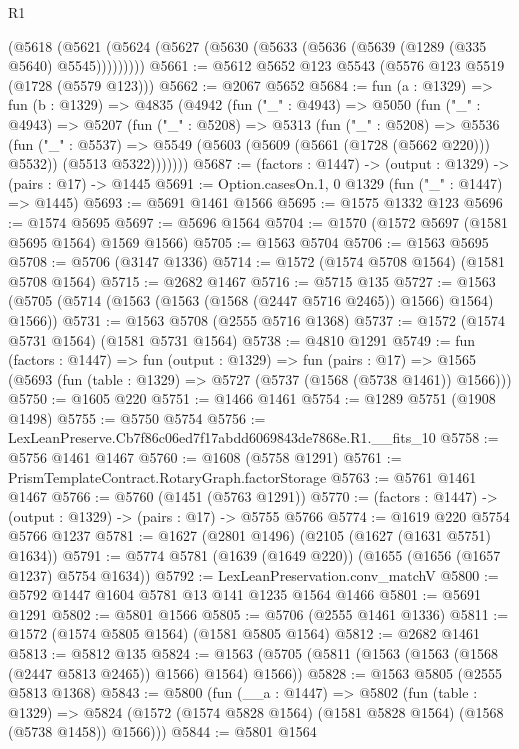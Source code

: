 \begin{lexlean}{R1}
\begin{coremodule}
    (@5618 (@5621 (@5624 (@5627 (@5630 (@5633 (@5636 (@5639 (@1289 (@335 @5640) @5545)))))))))
@5661 := @5612 @5652 @123 @5543 (@5576 @123 @5519 (@1728 (@5579 @123)))
@5662 := @2067 @5652
@5684 := fun (a : @1329) =>
  fun (b : @1329) =>
  @4835
    (@4942
      (fun ("_" : @4943) =>
      @5050
        (fun ("_" : @4943) =>
        @5207
          (fun ("_" : @5208) =>
          @5313
            (fun ("_" : @5208) =>
            @5536
              (fun ("_" : @5537) =>
              @5549 (@5603 (@5609 (@5661 (@1728 (@5662 @220))) @5532)) (@5513 @5322)))))))
@5687 := (factors : @1447) -> (output : @1329) -> (pairs : @17) -> @1445
@5691 := Option.casesOn.{1, 0} @1329 (fun ("_" : @1447) => @1445)
@5693 := @5691 @1461 @1566
@5695 := @1575 @1332 @123
@5696 := @1574 @5695
@5697 := @5696 @1564
@5704 := @1570 (@1572 @5697 (@1581 @5695 @1564) @1569 @1566)
@5705 := @1563 @5704
@5706 := @1563 @5695
@5708 := @5706 (@3147 @1336)
@5714 := @1572 (@1574 @5708 @1564) (@1581 @5708 @1564)
@5715 := @2682 @1467
@5716 := @5715 @135
@5727 := @1563 (@5705 (@5714 (@1563 (@1563 (@1568 (@2447 @5716 @2465)) @1566) @1564) @1566))
@5731 := @1563 @5708 (@2555 @5716 @1368)
@5737 := @1572 (@1574 @5731 @1564) (@1581 @5731 @1564)
@5738 := @4810 @1291
@5749 := fun (factors : @1447) =>
  fun (output : @1329) =>
  fun (pairs : @17) =>
  @1565 (@5693 (fun (table : @1329) => @5727 (@5737 (@1568 (@5738 @1461)) @1566)))
@5750 := @1605 @220
@5751 := @1466 @1461
@5754 := @1289 @5751 (@1908 @1498)
@5755 := @5750 @5754
@5756 := LexLeanPreserve.Cb7f86c06ed7f17abdd6069843de7868e.R1.__fits_10
@5758 := @5756 @1461 @1467
@5760 := @1608 (@5758 @1291)
@5761 := PrismTemplateContract.RotaryGraph.factorStorage
@5763 := @5761 @1461 @1467
@5766 := @5760 (@1451 (@5763 @1291))
@5770 := (factors : @1447) -> (output : @1329) -> (pairs : @17) -> @5755 @5766
@5774 := @1619 @220 @5754 @5766 @1237
@5781 := @1627 (@2801 @1496) (@2105 (@1627 (@1631 @5751) @1634))
@5791 := @5774 @5781 (@1639 (@1649 @220)) (@1655 (@1656 (@1657 @1237) @5754 @1634))
@5792 := LexLeanPreservation.conv_matchV
@5800 := @5792 @1447 @1604 @5781 @13 @141 @1235 @1564 @1466
@5801 := @5691 @1291
@5802 := @5801 @1566
@5805 := @5706 (@2555 @1461 @1336)
@5811 := @1572 (@1574 @5805 @1564) (@1581 @5805 @1564)
@5812 := @2682 @1461
@5813 := @5812 @135
@5824 := @1563 (@5705 (@5811 (@1563 (@1563 (@1568 (@2447 @5813 @2465)) @1566) @1564) @1566))
@5828 := @1563 @5805 (@2555 @5813 @1368)
@5843 := @5800
    (fun (__a : @1447) =>
    @5802
      (fun (table : @1329) =>
      @5824 (@1572 (@1574 @5828 @1564) (@1581 @5828 @1564) (@1568 (@5738 @1458)) @1566)))
@5844 := @5801 @1564

\end{coremodule}
\end{lexlean}
